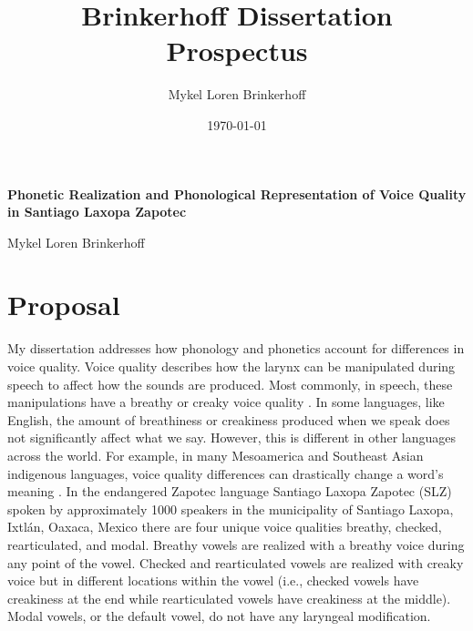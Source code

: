 \documentclass[12pt, letterpaper]{article}
\title{Brinkerhoff Dissertation Prospectus}
\author{Mykel Loren Brinkerhoff}
\date{\today}
\begin{document}

\onehalfspacing

\begin{center}
    {\Large \textbf{Phonetic Realization and Phonological Representation of Voice Quality in Santiago Laxopa Zapotec}}
    \vspace{6pt}

    Mykel Loren Brinkerhoff
\end{center}
\thispagestyle{fancy}


\section{Proposal} \label{sec:Introduction}

My dissertation addresses how phonology and phonetics account for differences in voice quality. 
Voice quality describes how the larynx can be manipulated during speech to affect how the sounds are produced. Most commonly, in speech, these manipulations have a breathy or creaky voice quality \citep{eslingVoiceQualityLaryngeal2019}. 
In some languages, like English, the amount of breathiness or creakiness produced when we speak does not significantly affect what we say. 
However, this is different in other languages across the world. For example, in many Mesoamerica and Southeast Asian indigenous languages, voice quality differences can drastically change a word's meaning \citep{espositoCrossLinguisticPatterns2020}.
In the endangered Zapotec language Santiago Laxopa Zapotec (SLZ) spoken by approximately 1000 speakers in the municipality of Santiago Laxopa, Ixtlán, Oaxaca, Mexico \citep{adlerAcousticsPhonationTypes2016, adlerDerivationVerbInitiality2018, brinkerhoffDownstepSantiagoLaxopaMFM, foleyForbiddenCliticClusters2018, SantiagoLaxopaEconomy, sichelFeaturalLifeNominals2020, silva-roblesElicitingAssociatedMotion2022} there are four unique voice qualities breathy, checked, rearticulated, and modal. 
Breathy vowels are realized with a breathy voice during any point of the vowel. 
Checked and rearticulated vowels are realized with creaky voice but in different locations within the vowel (i.e., checked vowels have creakiness at the end while rearticulated vowels have creakiness at the middle).
Modal vowels, or the default vowel, do not have any laryngeal modification. 
\end{document}
